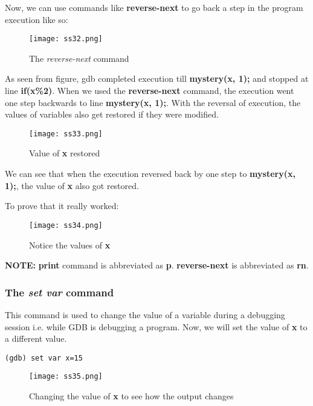 \documentclass{article}
\makeatletter
\renewcommand\paragraph{\@startsection{paragraph}{4}{\z@}{-3.25ex \@plus -1ex \@minus -.2ex}{1.5ex \@plus .2ex}{\normalfont\normalsize\bfseries}}
\makeatother
\begin{document}
Now, we can use commands like \textbf{reverse-next} to go back a step in the program execution like so:

\begin{figure}[h]
\centering
\texttt{[image: ss32.png]}
\caption{The \textit{reverse-next} command}
\end{figure}

As seen from figure, gdb completed execution till \textbf{mystery(x, 1);} and stopped at line \textbf{if(x\%2)}. When we used the \textbf{reverse-next} command, the execution went one step backwards to line \textbf{mystery(x, 1);}. With the reversal of execution, the values of variables also get restored if they were modified.

\begin{figure}[h]
\centering
\texttt{[image: ss33.png]}
\caption{Value of \textbf{x} restored}
\end{figure}

We can see that when the execution reversed back by one step to \textbf{mystery(x, 1);}, the value of \textbf{x} also got restored.

\newpage
To prove that it really worked:
\begin{figure}[h]
\centering
\texttt{[image: ss34.png]}
\caption{Notice the values of \textbf{x}}
\end{figure}

\textbf{NOTE:} \textbf{print} command is abbreviated as \textbf{p}. \textbf{reverse-next} is abbreviated as \textbf{rn}.
\newpage
\subsubsection{The \textit{set var} command}
\paragraph{}
This command is used to change the value of a variable during a debugging session i.e. while GDB is debugging a program.
Now, we will set the value of \textbf{x} to a different value.

\begin{Verbatim}[frame=single]
(gdb) set var x=15
\end{Verbatim}

\begin{figure}[h]
\centering
\texttt{[image: ss35.png]}
\caption{Changing the value of \textbf{x} to see how the output changes}
\end{figure}
\end{document}
